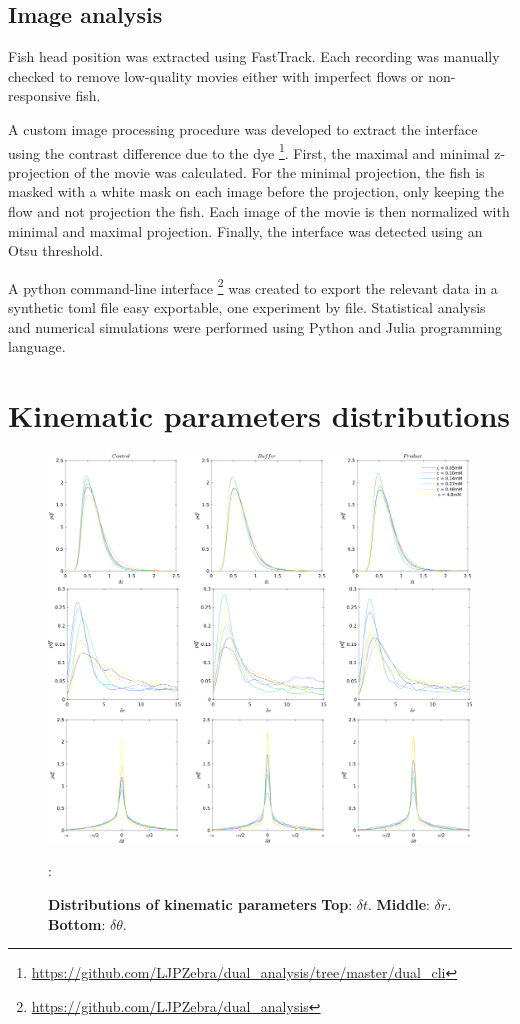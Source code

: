 \begin{appendices}
    \section{Image analysis}
     \label{auto_analysis}
    Fish head position was extracted using FastTrack. Each recording was manually checked to remove low-quality movies either with imperfect flows or non-responsive fish.

    A custom image processing procedure was developed to extract the interface using the contrast difference due to the dye \footnote{\url{https://github.com/LJPZebra/dual_analysis/tree/master/dual_cli}}. First, the maximal and minimal z-projection of the movie was calculated. For the minimal projection, the fish is masked with a white mask on each image before the projection, only keeping the flow and not projection the fish. Each image of the movie is then normalized with minimal and maximal projection. Finally, the interface was detected using an Otsu threshold.

    A python command-line interface \footnote{\url{https://github.com/LJPZebra/dual_analysis}} was created to export the relevant data in a synthetic toml file easy exportable, one experiment by file. Statistical analysis and numerical simulations were performed using Python and Julia programming language.

  \chapter{Kinematic parameters distributions}
    \begin{figure}[h!]
      \centering
      \includegraphics[width=1\textwidth]{part_2/assets/dist_citric_random.png}
      \caption{\textbf{Distributions of kinematic parameters} \textbf{Top}: $\delta t$. \textbf{Middle}: $\delta r$. \textbf{Bottom}: $\delta \theta$.}
      \label{dist_time_bout}:
    \end{figure}


\end{appendices}
